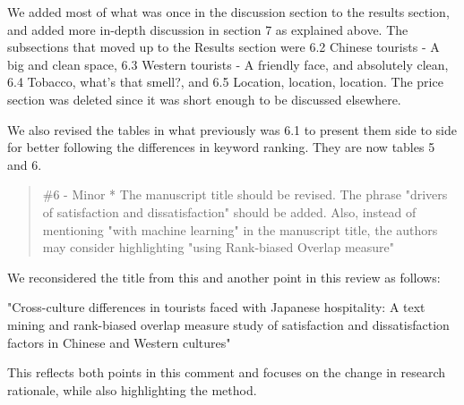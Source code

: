 \documentclass{letter}
\begin{document}
We added most of what was once in the discussion section to the results section, and added more in-depth discussion in section 7 as explained above. The subsections that moved up to the Results section were 6.2 Chinese tourists - A big and clean space, 6.3 Western tourists - A friendly face, and absolutely clean, 6.4 Tobacco, what’s that smell?, and 6.5 Location, location, location. The price section was deleted since it was short enough to be discussed elsewhere.

We also revised the tables in what previously was 6.1 to present them side to side for better following the differences in keyword ranking. They are now tables 5 and 6.



\begin{quotation}
\#6 - Minor
*  The manuscript title should be revised. The phrase "drivers of satisfaction and dissatisfaction" should be added. Also, instead of mentioning "with machine learning" in the manuscript title, the authors may consider highlighting "using Rank-biased Overlap measure"

\end{quotation}

We reconsidered the title from this and another point in this review as follows:

"Cross-culture differences in tourists faced with Japanese hospitality: A text mining and rank-biased overlap measure study of satisfaction and dissatisfaction factors in Chinese and Western cultures"

This reflects both points in this comment and focuses on the change in research rationale, while also highlighting the method.
\end{document}
